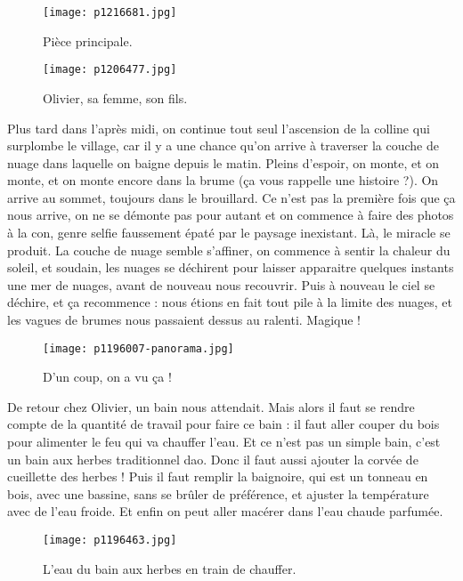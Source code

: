\documentclass{book}
\begin{document}
\begin{figure}[h]
\centering
\texttt{[image: p1216681.jpg]}
\caption*{Pièce principale.}
\end{figure}


\begin{figure}[h]
\centering
\texttt{[image: p1206477.jpg]}
\caption*{Olivier, sa femme, son fils.}
\end{figure}

Plus tard dans l'après midi, on continue tout seul l'ascension de la colline qui surplombe le village, car il y a une chance qu'on arrive à traverser la couche de nuage dans laquelle on baigne depuis le matin. Pleins d'espoir, on monte, et on monte, et on monte encore dans la brume (ça vous rappelle une histoire ?). On arrive au sommet, toujours dans le brouillard. Ce n'est pas la première fois que ça nous arrive, on ne se démonte pas pour autant et on commence à faire des photos à la con, genre selfie faussement épaté par le paysage inexistant. Là, le miracle se produit. La couche de nuage semble s'affiner, on commence à sentir la chaleur du soleil, et soudain, les nuages se déchirent pour laisser apparaitre quelques instants une mer de nuages, avant de nouveau nous recouvrir. Puis à nouveau le ciel se déchire, et ça recommence : nous étions en fait tout pile à la limite des nuages, et les vagues de brumes nous passaient dessus au ralenti. Magique !


\begin{figure}[h]
\centering
\texttt{[image: p1196007-panorama.jpg]}
\caption*{D'un coup, on a vu ça !}
\end{figure}

De retour chez Olivier, un bain nous attendait. Mais alors il faut se rendre compte de la quantité de travail pour faire ce bain : il faut aller couper du bois pour alimenter le feu qui va chauffer l'eau. Et ce n'est pas un simple bain, c'est un bain aux herbes traditionnel dao. Donc il faut aussi ajouter la corvée de cueillette des herbes ! Puis il faut remplir la baignoire, qui est un tonneau en bois, avec une bassine, sans se brûler de préférence, et ajuster la température avec de l'eau froide. Et enfin on peut aller macérer dans l'eau chaude parfumée.


\begin{figure}[h]
\centering
\texttt{[image: p1196463.jpg]}
\caption*{L'eau du bain aux herbes en train de chauffer.}
\end{figure}
\end{document}
